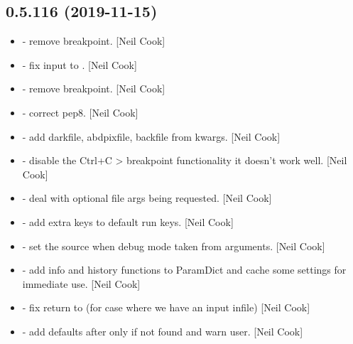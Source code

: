\documentclass[a4paper,10pt,english]{report}
\begin{document}
\subsection{0.5.116 (2019-11-15)}
\label{\detokenize{misc/changelog:id26}}\begin{itemize}
\item {} 
 - remove breakpoint. {[}Neil Cook{]}

\item {} 
 - fix input to . {[}Neil Cook{]}

\item {} 
 - remove breakpoint. {[}Neil Cook{]}

\item {} 
 - correct pep8. {[}Neil Cook{]}

\item {} 
 - add darkfile, abdpixfile, backfile from
kwargs. {[}Neil Cook{]}

\item {} 
 - disable the Ctrl+C \textendash{}\textgreater{} breakpoint
functionality it doesn’t work well. {[}Neil Cook{]}

\item {} 
 - deal with optional file args
being requested. {[}Neil Cook{]}

\item {} 
 - add extra keys to default run
keys. {[}Neil Cook{]}

\item {} 
 - set the source when debug mode taken from
arguments. {[}Neil Cook{]}

\item {} 
 - add info and history functions to
ParamDict and cache some settings for immediate use. {[}Neil Cook{]}

\item {} 
 - fix return to 
(for case where we have an input infile) {[}Neil Cook{]}

\item {} 
 - add defaults after only if not
found and warn user. {[}Neil Cook{]}


\end{itemize}
\end{document}

